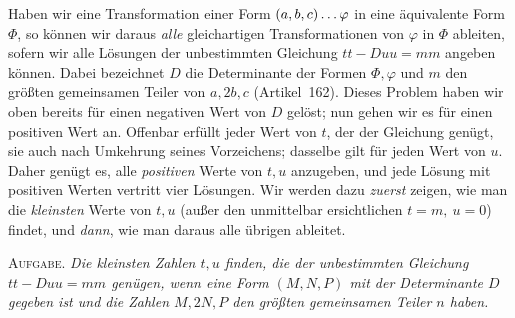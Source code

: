 Haben wir eine Transformation einer Form $(a,b,c)\mathinner{\ldotp\ldotp\ldotp}\varphi$ in eine äquivalente Form $\Phi$, so können wir daraus \textit{alle} gleichartigen Transformationen von $\varphi$ in $\Phi$ ableiten, sofern wir alle Lösungen der unbestimmten Gleichung $tt-Duu=mm$ angeben
können. Dabei bezeichnet \(D\) die Determinante der Formen \(\Phi,\varphi\) und \(m\) den größten gemeinsamen Teiler von \(a,2b,c\) (Artikel~162). Dieses Problem haben wir oben bereits für einen negativen Wert von \(D\) gelöst; nun gehen wir es für einen positiven Wert an. Offenbar erfüllt jeder Wert von \(t\), der der Gleichung genügt, sie auch nach Umkehrung seines Vorzeichens; dasselbe gilt für jeden Wert von \(u\). Daher genügt es, alle \textit{positiven} Werte von \(t,u\) anzugeben, und jede Lösung mit positiven Werten vertritt vier Lösungen. Wir werden dazu \textit{zuerst} zeigen, wie man die \textit{kleinsten} Werte von \(t,u\) (außer den unmittelbar ersichtlichen \(t=m,\ u=0\)) findet, und \textit{dann}, wie man daraus alle übrigen ableitet.

\textsc{Aufgabe.} \textit{Die kleinsten Zahlen \(t,u\) finden, die der unbestimmten Gleichung \(tt-Duu=mm\) genügen, wenn eine Form \((M,N,P)\) mit der Determinante \(D\) gegeben ist und die Zahlen \(M,2N,P\) den größten gemeinsamen Teiler \(n\) haben.}

